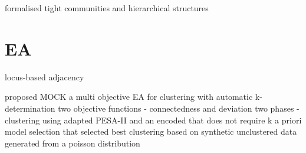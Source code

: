 \documentclass[•]{article}
\begin{document}

%
%
%

%


%


%

\cite{balcan2013modeling}
formalised tight communities and hierarchical structures

\section{EA}

locus-based adjacency \cite{park1998genetic}

\cite{handl2007evolutionary}
proposed MOCK a multi objective EA for clustering with automatic k-determination
two objective functions - connectedness and deviation
two phases - clustering using adapted PESA-II and an encoded that does not require k a priori
model selection that selected best clustering based on synthetic unclustered data generated from a poisson distribution
\end{document}
